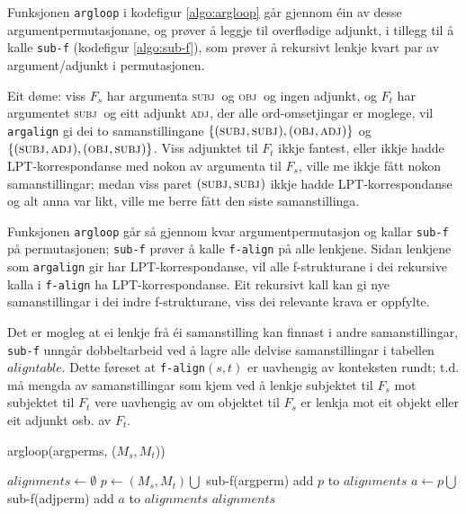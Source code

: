 \documentclass[11pt,a4paper,oneside,draft]{book}
\newcommand{\F}[2]{\textsc{#1}\ensuremath{_{#2}}}
\newcommand{\OBJ}{\F{obj}{}}
\newcommand{\OBJs}{\F{obj~}{}}
\newcommand{\ADJ}{\F{adj}{}}
\newcommand{\SUBJ}{\F{subj}{}}
\newcommand{\SUBJs}{\F{subj~}{}}
\begin{document}
 Funksjonen \texttt{argloop} i kodefigur \ref{algo:argloop} går gjennom éin
 av desse argumentpermutasjonane, og prøver å leggje til overflødige
 adjunkt, i tillegg til å kalle \texttt{sub-f} (kodefigur \ref{algo:sub-f}),
 som prøver å rekursivt lenkje kvart par av argument/adjunkt i
 permutasjonen.

 Eit døme: viss $F_s$ har argumenta \SUBJs og \OBJs og ingen adjunkt,
 og $F_t$ har argumentet \SUBJs og eitt adjunkt \ADJ, der alle
 ord-omsetjingar er moglege, vil \texttt{argalign} gi dei to samanstillingane
 $\{(\SUBJ,\SUBJ), (\OBJ,\ADJ)\}$ og $\{(\SUBJ,\ADJ),
 (\OBJ,\SUBJ)\}$. Viss adjunktet til $F_t$ ikkje fantest, eller ikkje
 hadde LPT-korrespondanse med nokon av argumenta til $F_s$, ville me
 ikkje fått nokon samanstillingar; medan viss paret $(\SUBJ,\SUBJ)$
 ikkje hadde LPT-korrespondanse og alt anna var likt, ville me berre
 fått den siste samanstillinga.

 Funksjonen \texttt{argloop} går så gjennom kvar argumentpermutasjon og
 kallar \texttt{sub-f} på permutasjonen; \texttt{sub-f} prøver å kalle \texttt{f-align} på
 alle lenkjene. Sidan lenkjene som \texttt{argalign} gir har
 LPT-korrespondanse, vil alle f-strukturane i dei rekursive kalla i
 \texttt{f-align} ha LPT-korrespondanse. Eit rekursivt kall kan gi nye
 samanstillingar i dei indre f-strukturane, viss dei relevante krava
 er oppfylte.

 Det er mogleg at ei lenkje frå éi samanstilling kan finnast i andre
 samanstillingar, \texttt{sub-f} unngår dobbeltarbeid ved å lagre alle
 delvise samanstillingar i tabellen $aligntable$. Dette føreset at
 \texttt{f-align}$(s,t)$ er uavhengig av konteksten rundt; t.d. må
 mengda av samanstillingar som kjem ved å lenkje subjektet til $F_s$
 mot subjektet til $F_t$ vere uavhengig av om objektet til $F_s$ er
 lenkja mot eit objekt eller eit adjunkt osb. av $F_t$. 

  \begin{algorithm}[]
    \caption{argloop(argperms, ($M_s,M_t$))}
    \label{algo:argloop}

    $alignments \gets \emptyset$  \;
     {
       {
        $p \gets (M_s,M_t) \bigcup$ sub-f(argperm)
        add $p$ to $alignments$ \;
         {
          $a \gets p \bigcup$ sub-f(adjperm)  
          add $a$ to $alignments$\;
        } %
      } %
    }
    \Return $alignments$
  \end{algorithm}    
  
\end{document}
